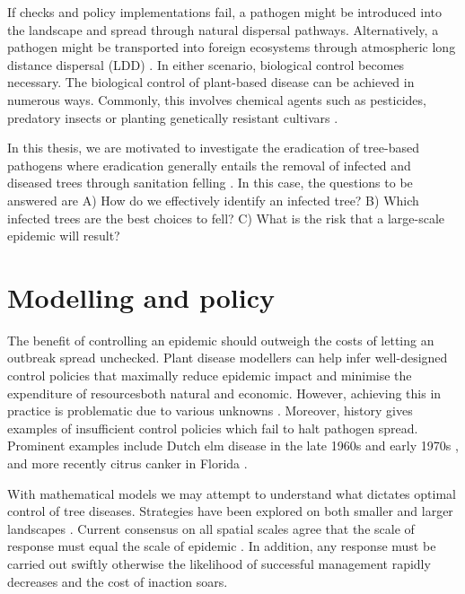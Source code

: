 If checks and policy implementations fail, a pathogen might be introduced into the landscape and spread through natural
dispersal pathways. Alternatively, a pathogen might be transported into foreign ecosystems through atmospheric 
long distance dispersal (LDD) \cite{brown2002aerial}. In either scenario, biological control becomes necessary. 
The biological control of plant-based disease
can be achieved in numerous ways. Commonly, this involves chemical agents such as pesticides, predatory insects or planting
genetically resistant cultivars \cite{pal2006biological, baker1974biological}. 

In this thesis, we are motivated to investigate the eradication of tree-based pathogens 
where eradication generally entails the removal of infected and diseased trees through sanitation felling \cite{pietzsch2021effect}. 
In this case, the questions to be answered are A) How do we effectively identify an infected tree? B) 
Which infected trees are the best choices to fell? C) What is the risk that a large-scale epidemic will result?


\section{Modelling and policy}


The benefit of controlling an epidemic should outweigh the costs of letting an outbreak spread unchecked. 
Plant disease modellers can help infer well-designed control policies that maximally reduce epidemic impact and minimise the expenditure
of resources\textemdash both natural and economic. However, achieving this in practice is problematic due to various unknowns \cite{13-challenges}.
Moreover, history gives examples of insufficient control policies which fail to halt pathogen spread. 
Prominent examples include Dutch elm disease in the late 1960s and early 1970s \cite{dutch-elm-mismanage}, 
and more recently citrus canker in Florida \cite{schubert2001meeting}.

With mathematical models we may attempt to understand what dictates optimal control of tree diseases. 
Strategies have been explored on both smaller \cite{WEBIDEMICS, risk-potential-control} 
and larger landscapes \cite{large-scale-control2}. Current consensus on all spatial scales
agree that the scale of response must equal the scale of epidemic \cite{control-scale-matching}. In addition, 
any response must be carried out swiftly otherwise the likelihood of successful management rapidly decreases and the cost of inaction soars.

